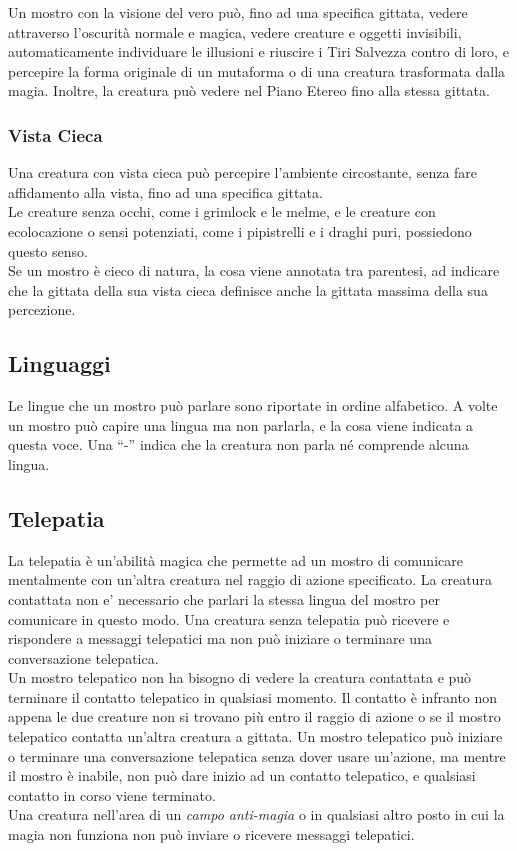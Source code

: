Un mostro con la visione del vero può, fino ad una specifica gittata, vedere attraverso l'oscurità normale e magica, vedere creature e oggetti invisibili, automaticamente individuare le illusioni e riuscire i Tiri Salvezza contro di loro, e percepire la forma originale di un mutaforma o di una creatura trasformata dalla magia. Inoltre, la creatura può vedere nel Piano Etereo fino alla stessa gittata.

\subsubsection{Vista Cieca}

Una creatura con vista cieca può percepire l'ambiente circostante, senza fare affidamento alla vista, fino ad una specifica gittata. \\
Le creature senza occhi, come i grimlock e le melme, e le creature con ecolocazione o sensi potenziati, come i pipistrelli e i draghi puri, possiedono questo senso. \\
Se un mostro è cieco di natura, la cosa viene annotata tra parentesi, ad indicare che la gittata della sua vista cieca definisce anche la gittata massima della sua percezione.\\

\subsection{Linguaggi}

Le lingue che un mostro può parlare sono riportate in ordine alfabetico. A volte un mostro può capire una lingua ma non parlarla, e la cosa viene indicata a questa voce. Una ``-'' indica che la creatura non parla né comprende alcuna lingua.

\subsection{Telepatia}

La telepatia è un'abilità magica che permette ad un mostro di comunicare mentalmente con un'altra creatura nel raggio di azione specificato. La creatura contattata non e' necessario che parlari la stessa lingua del mostro per comunicare in questo modo. Una creatura senza telepatia può ricevere e rispondere a messaggi telepatici ma non può iniziare o terminare una conversazione telepatica.\\
Un mostro telepatico non ha bisogno di vedere la creatura contattata e può terminare il contatto telepatico in qualsiasi momento. Il contatto è infranto non appena le due creature non si trovano più entro il raggio di azione o se il mostro telepatico contatta un'altra creatura a gittata. Un mostro telepatico può iniziare o terminare una conversazione  telepatica senza dover usare un'azione, ma mentre il mostro è inabile, non può dare inizio ad un contatto telepatico, e qualsiasi contatto in corso viene terminato.\\
Una creatura nell'area di un \emph{campo anti-magia} o in qualsiasi altro posto in cui la magia non funziona non può inviare o ricevere messaggi telepatici.

